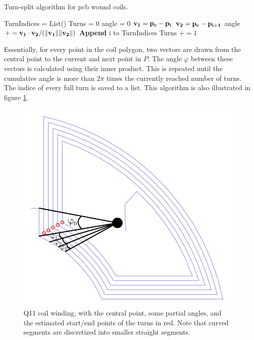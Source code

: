 \begin{algorithm}
    \caption{Turn-split algorithm for pcb wound coils.}
    \label{alg:turnsplit}
    \begin{algorithmic}
        \State TurnIndices = List()
        \State Turns = 0
        \State angle = 0
        \State $\vb{v_1} = \vb{p_c} - \vb{p_i}$
        \State $\vb{v_2} = \vb{p_c} - \vb{p_{i+1}}$
        \State angle $+= \vb{v_1}\cdot\vb{v_2}
            /(\|\vb{v_1}\|\|\vb{v_2}\|)$
        \State \textbf{Append} i to TurnIndices
        \State Turns $+= 1$
        \EndIf
        \EndFor
    \end{algorithmic}
\end{algorithm}

Essentially, for every point in the coil polygon, two vectors
are drawn from the central point to the current and next point
in $P$. The angle $\varphi$ between these vectors is calculated using their
inner product. This is repeated until the cumulative angle is more
than $2\pi$ times the currently reached number of turns. The indice
of every full turn is saved to a list. This algorithm is also illustrated
in figure \ref{fig:Q11-winding}.

\begin{figure}[!h]
    \centering
    \includegraphics[width=0.8\linewidth]{figs/Q11-roundwalk}
    \caption{Q11 coil winding, with the central point, some
        partial angles, and the estimated start/end points of
        the turns in red.
        Note that curved segments are discretized into smaller
        straight segments.}
    \label{fig:Q11-winding}
\end{figure}

